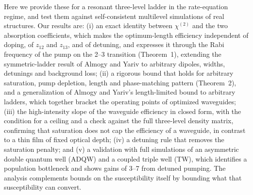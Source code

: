 \documentclass[11pt]{article}
\newcommand{\chitwo}{\chi^{(2)}}
\begin{document}
Here we provide these for a resonant three-level ladder in the rate-equation regime, and test them against self-consistent multilevel simulations of real structures. Our results are: (i) an exact identity between $\chitwo$ and the two absorption coefficients, which makes the optimum-length efficiency independent of doping, of $z_{12}$ and $z_{13}$, and of detuning, and expresses it through the Rabi frequency of the pump on the 2--3 transition (Theorem~1), extending the symmetric-ladder result of Almogy and Yariv to arbitrary dipoles, widths, detunings and background loss; (ii) a rigorous bound that holds for arbitrary saturation, pump depletion, length and phase-matching pattern (Theorem~2), and a generalization of Almogy and Yariv's length-limited bound to arbitrary ladders, which together bracket the operating points of optimized waveguides; (iii) the high-intensity slope of the waveguide efficiency in closed form, with the condition for a ceiling and a check against the full three-level density matrix, confirming that saturation does not cap the efficiency of a waveguide, in contrast to a thin film of fixed optical depth; (iv) a detuning rule that removes the saturation penalty; and (v) a validation with full simulations of an asymmetric double quantum well (ADQW) and a coupled triple well (TW), which identifies a population bottleneck and shows gains of 3--7 from detuned pumping. The analysis complements bounds on the susceptibility itself \cite{Kuzyk2000} by bounding what that susceptibility can convert.
\end{document}
